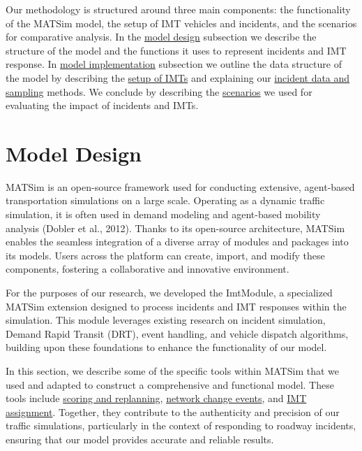 \documentclass[fancy, oneside, mastersfancy, ms]{byuthesis}
\begin{document}
Our methodology is structured around three main components: the
functionality of the MATSim model, the setup of IMT vehicles and
incidents, and the scenarios for comparative analysis. In the
\protect\hyperlink{sec-MATSim_mod}{model design} subsection we describe
the structure of the model and the functions it uses to represent
incidents and IMT response. In \protect\hyperlink{sec-model_imp}{model
implementation} subsection we outline the data structure of the model by
describing the \protect\hyperlink{sec-IMT_setup}{setup of IMTs} and
explaining our \protect\hyperlink{sec-inc_data}{incident data and
sampling} methods. We conclude by describing the
\protect\hyperlink{sec-scenarios}{scenarios} we used for evaluating the
impact of incidents and IMTs.

\hypertarget{sec-MATSim_mod}{%
\section{Model Design}\label{sec-MATSim_mod}}

MATSim is an open-source framework used for conducting extensive,
agent-based transportation simulations on a large scale. Operating as a
dynamic traffic simulation, it is often used in demand modeling and
agent-based mobility analysis (Dobler et al., 2012). Thanks to its
open-source architecture, MATSim enables the seamless integration of a
diverse array of modules and packages into its models. Users across the
platform can create, import, and modify these components, fostering a
collaborative and innovative environment.

For the purposes of our research, we developed the ImtModule, a
specialized MATSim extension designed to process incidents and IMT
responses within the simulation. This module leverages existing research
on incident simulation, Demand Rapid Transit (DRT), event handling, and
vehicle dispatch algorithms, building upon these foundations to enhance
the functionality of our model.

In this section, we describe some of the specific tools within MATSim
that we used and adapted to construct a comprehensive and functional
model. These tools include \protect\hyperlink{sec-MATSim_score}{scoring
and replanning}, \protect\hyperlink{sec-NCE}{network change events}, and
\protect\hyperlink{sec-imt_response}{IMT assignment}. Together, they
contribute to the authenticity and precision of our traffic simulations,
particularly in the context of responding to roadway incidents, ensuring
that our model provides accurate and reliable results.
\end{document}
